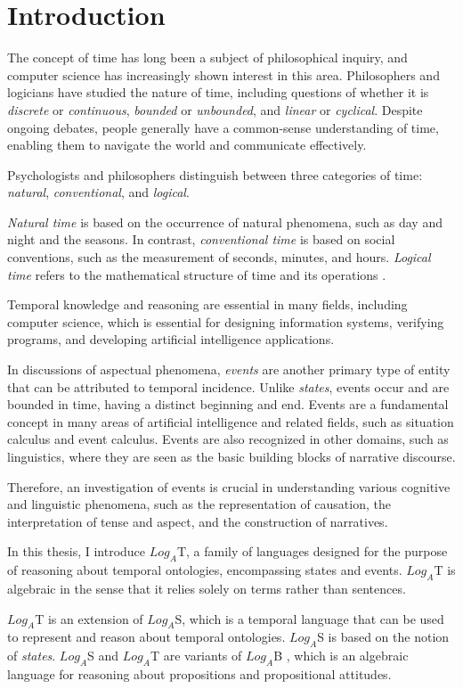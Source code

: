 \chapter{Introduction}
The concept of time has long been a subject of philosophical inquiry, and computer science has increasingly shown interest in this area.
Philosophers and logicians have studied the nature of time, including questions of whether it is \textit{discrete} or \textit{continuous}, \textit{bounded} or \textit{unbounded}, and \textit{linear} or \textit{cyclical}.
Despite ongoing debates, people generally have a common-sense understanding of time, enabling them to navigate the world and communicate effectively.

Psychologists and philosophers distinguish between three categories of time: \textit{natural}, \textit{conventional}, and \textit{logical}.

\textit{Natural time} is based on the occurrence of natural phenomena, such as day and night and the seasons. In contrast, \textit{conventional time} is based on social conventions, such as the measurement of seconds, minutes, and hours.
\textit{Logical time} refers to the mathematical structure of time and its operations \cite{Galton1990-GALTLA-3}.

Temporal knowledge and reasoning are essential in many fields, including computer science, which is essential for designing information systems, verifying programs, and developing artificial intelligence applications.

In discussions of aspectual phenomena, \textit{events} are another primary type of entity that can be attributed to temporal incidence.
Unlike \textit{states}, events \cite{vendler1957verbs} occur and are bounded in time, having a distinct beginning and end. Events are a fundamental concept in many areas of artificial intelligence and related fields, such as situation calculus and event calculus.
Events are also recognized in other domains, such as linguistics, where they are seen as the basic building blocks of narrative discourse.

Therefore, an investigation of events is crucial in understanding various cognitive and linguistic phenomena, such as the representation of causation, the interpretation of tense and aspect, and the construction of narratives.


In this thesis, I introduce $Log_A$T, a family of languages designed for the purpose of reasoning about temporal ontologies, encompassing states and events.
$Log_A$T is algebraic in the sense that it relies solely on terms rather than sentences.

$Log_A$T is an extension of $Log_A$S, which is a temporal language that can be used to represent and reason about temporal ontologies.
$Log_A$S is based on the notion of \textit{states}.
$Log_A$S and $Log_A$T are variants of $Log_A$B \cite{log_ab}, which is an algebraic language
for reasoning about propositions and propositional attitudes.

